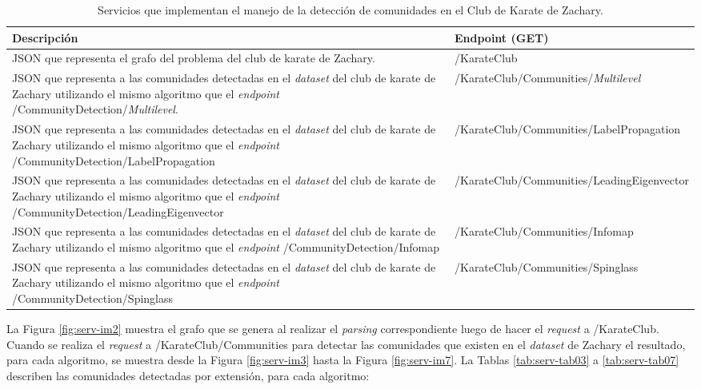 \begin{table}[H]
  \begin{center}
    \caption[Servicios que implementan el manejo de la detección de comunidades en el Club de Karate de Zachary.]{Servicios que implementan el manejo de la detección de comunidades en el Club de Karate de Zachary.}
    \label{tab:serv-tab02}
      \begin{tabular}{|L{6cm}|L{10cm}|}
        \hline
        \textbf{Descripción} & \textbf{Endpoint (GET)}\\ \hline
         JSON que representa el grafo del problema del club de karate de Zachary. & /KarateClub \\ \hline
         JSON que representa a las comunidades detectadas en el \textit{data\textit{set}} del club de karate de Zachary utilizando el mismo algoritmo que el \textit{endpoint} /CommunityDetection/\textit{Multilevel}. & /KarateClub/Communities/\textit{Multilevel} \\ \hline
         JSON que representa a las comunidades detectadas en el \textit{data\textit{set}} del club de karate de Zachary utilizando el mismo algoritmo que el \textit{endpoint} /CommunityDetection/LabelPropagation & /KarateClub/Communities/LabelPropagation \\ \hline
         JSON que representa a las comunidades detectadas en el \textit{data\textit{set}} del club de karate de Zachary utilizando el mismo algoritmo que el \textit{endpoint} /CommunityDetection/LeadingEigenvector & /KarateClub/Communities/LeadingEigenvector \\ \hline
         JSON que representa a las comunidades detectadas en el \textit{data\textit{set}} del club de karate de Zachary utilizando el mismo algoritmo que el \textit{endpoint} /CommunityDetection/Infomap & /KarateClub/Communities/Infomap \\ \hline
         JSON que representa a las comunidades detectadas en el \textit{data\textit{set}} del club de karate de Zachary utilizando el mismo algoritmo que el \textit{endpoint} /CommunityDetection/Spinglass & /KarateClub/Communities/Spinglass \\ \hline
      \end{tabular}
  \end{center}
\end{table}

La Figura \ref{fig:serv-im2} muestra el grafo que se genera al realizar el \textit{parsing} correspondiente luego de hacer el \textit{request} a /KarateClub. Cuando se realiza el \textit{request} a /KarateClub/Communities para detectar las comunidades que existen en el \textit{data\textit{set}} de Zachary el resultado, para cada algoritmo, se muestra desde la Figura \ref{fig:serv-im3} hasta la Figura \ref{fig:serv-im7}. La Tablas \ref{tab:serv-tab03} a \ref{tab:serv-tab07} describen las comunidades detectadas por extensión, para cada algoritmo:

